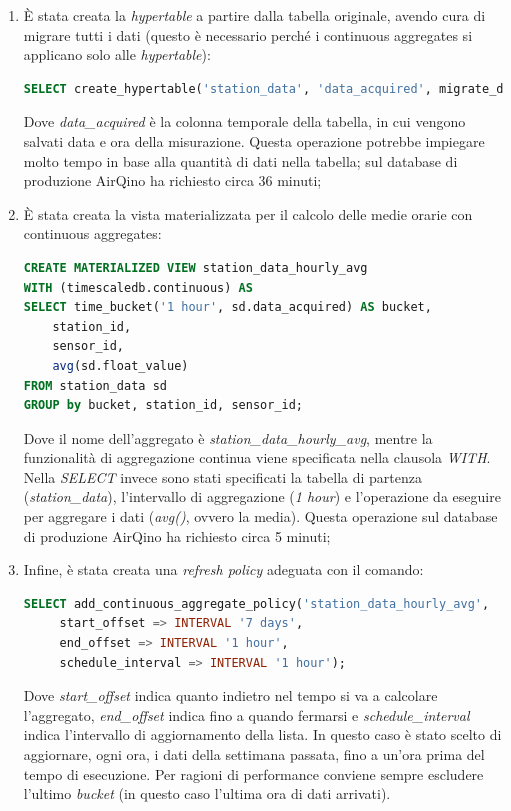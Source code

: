 \begin{enumerate}
  \item È stata creata la \textit{hypertable} a partire dalla tabella originale, avendo cura di migrare tutti i dati (questo è necessario perché i continuous aggregates si applicano solo alle \textit{hypertable}):
\vspace{1mm}
\begin{lstlisting}[language=sql]
SELECT create_hypertable('station_data', 'data_acquired', migrate_data => true);
\end{lstlisting}
Dove \textit{data\_acquired} è la colonna temporale della tabella, in cui vengono salvati data e ora della misurazione.
Questa operazione potrebbe impiegare molto tempo in base alla quantità di dati nella tabella; sul database di produzione AirQino ha richiesto circa 36 minuti;
  \item È stata creata la vista materializzata per il calcolo delle medie orarie con continuous aggregates:
\vspace{1mm}
\begin{lstlisting}[language=sql]
CREATE MATERIALIZED VIEW station_data_hourly_avg
WITH (timescaledb.continuous) AS
SELECT time_bucket('1 hour', sd.data_acquired) AS bucket, 
    station_id,  
    sensor_id, 
    avg(sd.float_value) 
FROM station_data sd
GROUP by bucket, station_id, sensor_id;
\end{lstlisting}
Dove il nome dell'aggregato è \textit{station\_data\_hourly\_avg}, mentre la funzionalità di aggregazione continua viene specificata nella clausola \textit{WITH}. Nella \textit{SELECT} invece sono stati specificati la tabella di partenza (\textit{station\_data}), l'intervallo di aggregazione (\textit{1 hour}) e l'operazione da eseguire per aggregare i dati (\textit{avg()}, ovvero la media).
Questa operazione sul database di produzione AirQino ha richiesto circa 5 minuti;
  \item Infine, è stata creata una \textit{refresh policy} adeguata con il comando:
\vspace{1mm}
\begin{lstlisting}[language=sql]
SELECT add_continuous_aggregate_policy('station_data_hourly_avg',
     start_offset => INTERVAL '7 days',
     end_offset => INTERVAL '1 hour',
     schedule_interval => INTERVAL '1 hour');
\end{lstlisting}
Dove \textit{start\_offset} indica quanto indietro nel tempo si va a calcolare l'aggregato, \textit{end\_offset} indica fino a quando fermarsi e \textit{schedule\_interval} indica l'intervallo di aggiornamento della lista.
In questo caso è stato scelto di aggiornare, ogni ora, i dati della settimana passata, fino a un'ora prima del tempo di esecuzione.
Per ragioni di performance conviene sempre escludere l'ultimo \textit{bucket} (in questo caso l'ultima ora di dati arrivati). \cite{timescale_ca}
\end{enumerate}

